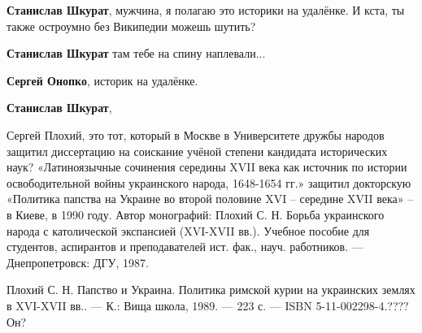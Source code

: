 \begin{itemize}
\begin{itemize}
 
\textbf{Станислав Шкурат}, мужчина, я полагаю это историки на удалёнке. И кста, ты также остроумно без Википедии можешь шутить?

 
\textbf{Станислав Шкурат} там тебе на спину наплевали...

 
\textbf{Сергей Онопко}, историк на удалёнке.

 
\textbf{Станислав Шкурат},

Сергей Плохий, это тот, который в Москве в Университете дружбы народов защитил
диссертацию на соискание учёной степени кандидата исторических наук?
«Латиноязычные сочинения середины XVII века как источник по истории
освободительной войны украинского народа, 1648-1654 гг.» защитил докторскую
«Политика папства на Украине во второй половине XVI – середине XVII века» – в
Киеве, в 1990 году. Автор монографий: Плохий С. Н. Борьба украинского народа с
католической экспансией (XVI-XVII вв.). Учебное пособие для студентов,
аспирантов и преподавателей ист. фак., науч. работников. — Днепропетровск: ДГУ,
1987.

Плохий С. Н. Папство и Украина. Политика римской курии на украинских землях в
XVI-XVII вв.. — К.: Вища школа, 1989. — 223 с. — ISBN 5-11-002298-4.???? Он?

 

\end{itemize}
\end{itemize}
